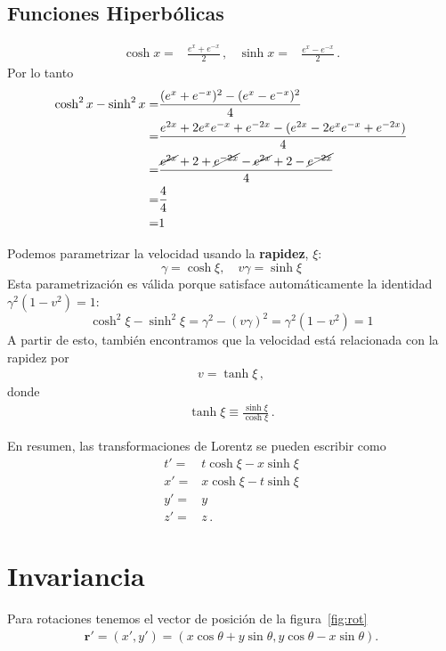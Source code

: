 \documentclass[11pt,a4paper]{article}
\begin{document}
\subsection{Funciones Hiperbólicas}
\begin{align*}
    \cosh x =& \frac{{e}^{x}+{e}^{-x}}{2}\,,&
\sinh x =& \frac{{e}^{x}-{e}^{-x}}{2}\,.
\end{align*}
Por lo tanto
\begin{align*}
    \cosh^2x - \sinh^2x =& \frac{({e}^{x}+{e}^{-x})^2
    -({e}^{x}-{e}^{-x})^2}{4}\\
    =&\frac{{e}^{2x}+2{e}^{x}{e}^{-x}+{e}^{-2x}
-({e}^{2x}-2{e}^{x}{e}^{-x}+{e}^{-2x})}{4}\\
=&\frac{\cancel{{e}^{2x}}+2+\cancel{{e}^{-2x}}
-\cancel{{e}^{2x}}+2-\cancel{{e}^{-2x}}}{4}\\
=&\frac{4}{4}\\
=&1
\end{align*}

Podemos parametrizar la velocidad usando la \textbf{rapidez}, $\xi$:
\[ \gamma = \cosh\xi, \quad v\gamma = \sinh\xi \]
Esta parametrización es válida porque satisface automáticamente la identidad $\gamma^2(1-v^2)=1$:
\[ \cosh^2\xi - \sinh^2\xi = \gamma^2 - (v\gamma)^2 = \gamma^2(1-v^2) = 1 \]
A partir de esto, también encontramos que la velocidad está relacionada con la rapidez por 
\begin{align*}
    v = \tanh\xi\,,
\end{align*}
donde
\begin{align*}
\tanh\xi \equiv \frac{\sinh\xi}{\cosh\xi}\,.    
\end{align*}

En resumen, las transformaciones de Lorentz se pueden escribir como
\[
\boxed{
\begin{aligned}    
    t' =& t\cosh\xi - x\sinh\xi \\
    x' = &x\cosh\xi -t\sinh\xi\\
    y' = & y\\
    z' = &z\,.
\end{aligned}
}
\]

\section{Invariancia}
Para rotaciones tenemos el vector de posición de la figura~\ref{fig:rot}
\begin{align*}
    \boldsymbol{r}' = (x',y')=  (x\cos\theta+y\sin\theta,y\cos\theta-x\sin\theta).
\end{align*}
\end{document}
